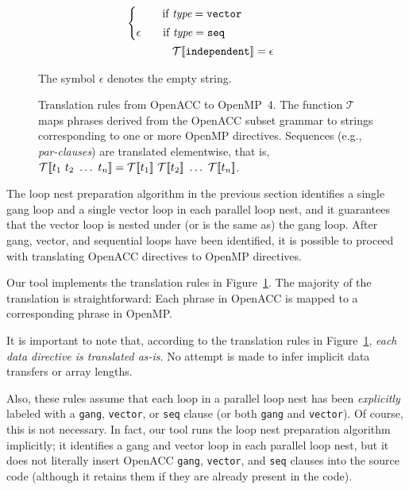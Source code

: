 \documentclass{sig-alternate-05-2015}
\begin{document}
\begin{figure*}
\begin{align*}
\begin{cases}
        \hspace*{2em} \textup{ if $\textit{type} = \texttt{vector}$} \vspace*{.25em} \\
   \epsilon
        \hspace*{1.65em} \textup{ if $\textit{type} = \texttt{seq}$} \\
   \end{cases} \\
%
\translate{\texttt{independent}} &=
   \epsilon \\
%
\end{align*}
\caption{Translation rules from OpenACC to OpenMP~4.  The function
$\mathcal{T}$ maps phrases derived from the OpenACC subset grammar to
strings corresponding to one or more OpenMP directives.  Sequences
(e.g., \textit{par-clauses}) are translated elementwise, that is,
$\translate{t_1\ t_2\ \dots\ t_n} =
\translate{t_1}\ \translate{t_2}\ \dots\ \translate{t_n}$.}
The symbol $\epsilon$ denotes the empty string.
\label{fig:rules}
\end{figure*}

The loop nest preparation algorithm in the previous section identifies a single
gang loop and a single vector loop in each parallel loop nest, and it guarantees
that the vector loop is nested under (or is the same as) the gang loop.  After
gang, vector, and sequential loops have been identified, it is possible to
proceed with translating OpenACC directives to OpenMP directives.

Our tool implements the translation rules in Figure~\ref{fig:rules}.  The
majority of the translation is straightforward: Each phrase in OpenACC is
mapped to a corresponding phrase in OpenMP\@.

It is important to note that, according to the translation rules in
Figure~\ref{fig:rules}, \emph{each data directive is translated as-is}.  No
attempt is made to infer implicit data transfers or array lengths.

Also, these rules assume that each loop in a parallel loop nest has been
\emph{explicitly} labeled with a \texttt{gang}, \texttt{vector}, or
\texttt{seq} clause (or both \texttt{gang} and \texttt{vector}).  Of course,
this is not necessary.  In fact, our tool runs the loop nest preparation
algorithm implicitly; it identifies a gang and vector loop in each parallel
loop nest, but it does not literally insert OpenACC \texttt{gang},
\texttt{vector}, and \texttt{seq} clauses into the source code (although
it retains them if they are already present in the code).
\end{document}
